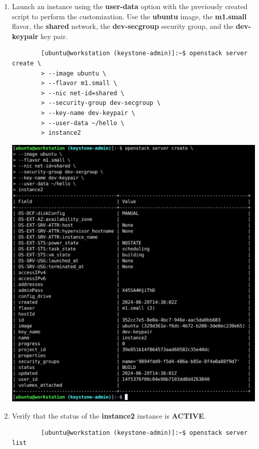 \documentclass[letterpaper, 12pt]{article}
\begin{document}
\begin{enumerate}
    \item Launch an instance using the \textbf{user-data} option with the previously created script to perform the
    customization. Use the \textbf{ubuntu} image, the \textbf{m1.small} flavor, the \textbf{shared} network, the
    \textbf{dev-secgroup} security group, and the \textbf{dev-keypair} key pair.
    \begin{lstlisting}
        [ubuntu@workstation (keystone-admin)]:~$ openstack server create \
        > --image ubuntu \
        > --flavor m1.small \
        > --nic net-id=shared \
        > --security-group dev-secgroup \
        > --key-name dev-keypair \
        > --user-data ~/hello \
        > instance2
    \end{lstlisting}

    \begin{center}
        \includegraphics[width=\linewidth]{images/part3/step3.png}
    \end{center}

    \item Verify that the status of the \textbf{instance2} instance is \textbf{ACTIVE}.
    \begin{lstlisting}
        [ubuntu@workstation (keystone-admin)]:~$ openstack server list
    \end{lstlisting}


\end{enumerate}
\end{document}
